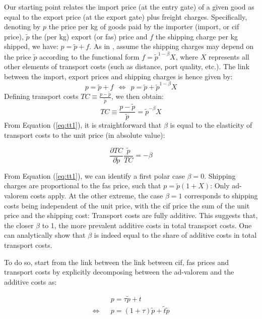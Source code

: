 \documentclass[a4paper,11pt]{article}
\begin{document}
Our starting point relates the import price (at the entry gate) of a given good as equal to the export price (at the export gate) plus freight charges. Specifically, denoting by $p$ the price per kg of goods paid by the importer (import, or cif price), $\widetilde{p}$ the (per kg) export (or fas) price and $f$ the shipping charge per kg shipped, we have: $ p = \widetilde{p} +f$. As in \cite{hummels2010}, assume the shipping charges may depend on the price $\widetilde{p}$ according to the functional form $f = \widetilde{p}^{1-\beta} X$, where $X$ represents all other elements of transport costs (such as distance, port quality, etc.). The link between the import, export prices and shipping charges is hence given by:
$$ p = \widetilde{p}+f ~~ \Leftrightarrow  ~~ p = \widetilde{p}+\widetilde{p}^{1-\beta} X $$
Defining transport costs $TC \equiv \frac{p-\widetilde{p}}{\widetilde{p}}$, we then obtain:
\begin{equation}
TC \equiv \frac{p-\widetilde{p}}{\widetilde{p}} = \widetilde{p}^{-\beta} X \label{eq:tt1}
\end{equation}
From Equation (\ref{eq:tt1}), it is straightforward that $\beta$ is equal to the elasticity of transport costs to the unit price (in absolute value):

\begin{equation}
\frac{\partial TC}{\partial \widetilde{p}} \frac{\widetilde{p}}{TC} = - \beta \label{eq:alternative}
\end{equation}

From Equation (\ref{eq:tt1}), we can identify a first polar case $\beta=0$. Shipping charges are proportional to the fas price, such that $p=\widetilde{p}(1+X)$: Only ad-valorem costs apply. At the other extreme, the case $\beta=1$ corresponds to shipping costs being independent of the unit price, with the cif price the sum of the unit price and the shipping cost: Transport costs are fully additive.
This suggests that, the closer $\beta$ to 1, the more prevalent additive costs in total transport costs. One can analytically show that $\beta$ is indeed equal to the share of additive costs in total transport costs. 

To do so, start from the link between the link between cif, fas prices and transport costs by explicitly decomposing between the ad-valorem and the additive costs as:

\begin{eqnarray}
&& p = \tau \widetilde{p}+ t \label{eq:tt0} \\
\Leftrightarrow && p = (1+\tau) \widetilde{p}+ \widetilde{t}\widetilde{p}  \label{eq:base}
\end{eqnarray}
\end{document}
